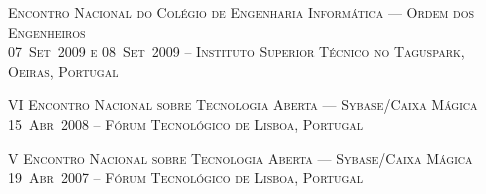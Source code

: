 \documentclass[a4paper,fontsize=10pt]{scrartcl} %
\begin{document}
\begin{minipage}[t]{0.46\textwidth}
\par
\textsc{Encontro Nacional do Colégio de Engenharia Informática --- Ordem dos Engenheiros}\\
\small\textsc{07~Set~2009 e 08~Set~2009 -- Instituto Superior Técnico no Taguspark, Oeiras, Portugal}\\ \normalsize
\par
\textsc{VI Encontro Nacional sobre Tecnologia Aberta --- Sybase/Caixa Mágica}\\
\small\textsc{15~Abr~2008 -- Fórum Tecnológico de Lisboa, Portugal}\\ \normalsize
\par
\textsc{V Encontro Nacional sobre Tecnologia Aberta --- Sybase/Caixa Mágica}\\
\small\textsc{19~Abr~2007 -- Fórum Tecnológico de Lisboa, Portugal}\\ \normalsize
\par
\end{minipage} %
\end{document}
